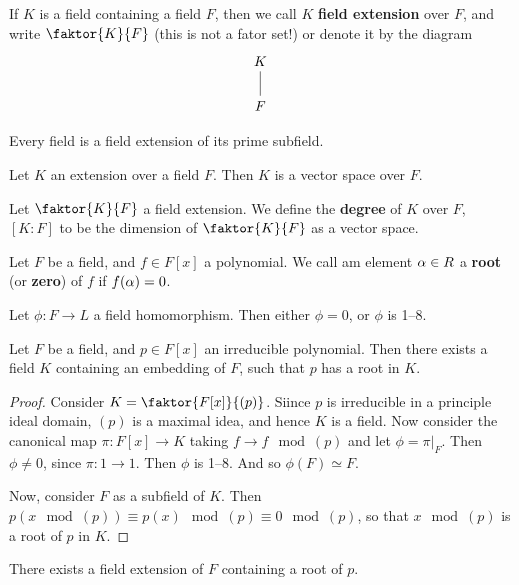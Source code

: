 \begin{definition}
  If $K$ is a field containing a field $F$, then we call  $K$  \textbf{field
  extension} over $F$, and write  $\faktor{K}{F}$ (this is not a fator
  set!) or denote it by the diagram
  \[\begin{tikzcd}
    K \\
    F
    \arrow[no head, from=1-1, to=2-1]
  \end{tikzcd}\]
\end{definition}

\begin{lemma}\label{lemma_8.1.2}
  Every field is a field extension of its prime subfield.
\end{lemma}

\begin{lemma}\label{lemma_8.1.3}
  Let $K$ an extension over a field  $F$. Then  $K$ is a vector space over
  $F$.
\end{lemma}

\begin{definition}
  Let $\faktor{K}{F}$ a field extension. We define the \textbf{degree} of $K$
  over $F$, $[K:F]$ to be the dimension of  $\faktor{K}{F}$ as a vector space.
\end{definition}

\begin{definition}
  Let $F$ be a field, and  $f \in F[x]$ a polynomial. We call am element $\alpha
  \in R$ a  \textbf{root} (or \textbf{zero}) of $f$ if  $f(\alpha)=0$.
\end{definition}

\begin{lemma}\label{lemma_8.1.4}
  Let $\phi:F \xrightarrow{} L$ a field homomorphism. Then either $\phi=0$, or
  $\phi$ is 1--8.
\end{lemma}

\begin{lemma}\label{lemma_8.1.5}
  Let $F$ be a field, and  $p \in F[x]$ an irreducible polynomial. Then there
  exists a field $K$ containing an embedding of  $F$, such that  $p$ has a
  root in  $K$.
\end{lemma}
\begin{proof}
  Consider $K=\faktor{F[x]}{(p)}$. Siince $p$ is irreducible in a principle
  ideal domain, $(p)$ is a maximal idea, and hence $K$ is a field. Now
  consider the canonical map  $\pi:F[x] \xrightarrow{} K$ taking $f
  \xrightarrow{} f \mod{(p)}$ and let $\phi=\pi|_{F}$. Then $\phi \neq 0$,
  since  $\pi:1 \xrightarrow{} 1$. Then $\phi$ is 1--8. And so  $\phi(F)
  \simeq F$.

  Now, consider $F$ as a subfield of  $K$. Then $p(x \mod{(p)}) \equiv
  p(x) \mod{(p)} \equiv 0 \mod{(p)}$, so that $x \mod{(p)}$ is a root of
  $p$ in  $K$.
\end{proof}
\begin{corollary}
  There exists a field extension of $F$ containing a root of  $p$.
\end{corollary}

